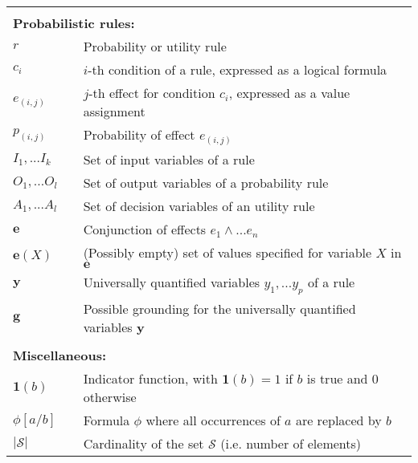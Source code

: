 \begin{longtable}{lp{5mm}p{11cm}}
&&  \vspace{3mm} \\
\multicolumn{3}{l}{\textbf{Probabilistic rules:}} \vspace{2mm} \\
$r$ && Probability or utility rule \\
$c_i$ && $i$-th condition of a rule, expressed as a logical formula \\
$e_{(i,j)}$ && $j$-th effect for condition $c_i$, expressed as a value assignment \\
$p_{(i,j)}$ && Probability of effect $e_{(i,j)}$ \\
$I_1,...I_{k}$  && Set of input variables of a rule\\
$O_1,...O_{l}$ && Set of output variables of a probability rule \\
$A_1,...A_{l}$ && Set of decision variables of an utility rule \\
$\mathbf{e}$ && Conjunction of effects $e_1 \land ... e_n$ \\
$\mathbf{e}(X)$ && (Possibly empty) set of values specified for variable $X$ in $\mathbf{e}$ \\
$\mathbf{y}$ && Universally quantified variables $y_1,... y_p$ of a rule  \\
$\mathbf{g}$ && Possible grounding for the universally quantified variables $\mathbf{y}$ \\
&&  \vspace{3mm} \\
\multicolumn{3}{l}{\textbf{Miscellaneous:}} \vspace{2mm} \\
$\mathbf{1}(b)$ && Indicator function, with $\mathbf{1}(b) = 1$ if $b$ is true and 0 otherwise \\
$\phi[a / b]$ && Formula $\phi$ where all occurrences of $a$ are replaced by $b$ \\
$|\mathcal{S}|$ && Cardinality of the set $\mathcal{S}$ (i.e. number of elements) 
\end{longtable}
